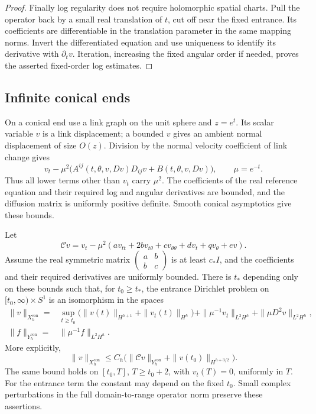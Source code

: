 \begin{proof}
Finally log regularity does not require holomorphic spatial charts.
Pull the operator back by a small real translation of $t$, cut off
near the fixed entrance.  Its coefficients are differentiable in the
translation parameter in the same mapping norms.  Invert the
differentiated equation and use uniqueness to identify its derivative
with $\partial_t v$.  Iteration, increasing the fixed angular order if
needed, proves the asserted fixed-order log estimates.
\end{proof}

\subsection{Infinite conical ends}

On a conical end use a link graph on the unit sphere and $z=e^t$.
Its scalar variable $v$ is a link displacement; a bounded $v$ gives an
ambient normal displacement of size $O(z)$.  Division by the normal
velocity coefficient of link change gives
\[
 v_t-\mu^2\bigl(A^{ij}(t,\theta,v,Dv)D_{ij}v
                         +B(t,\theta,v,Dv)\bigr),\qquad \mu=e^{-t}.
\]
Thus all lower terms other than $v_t$ carry $\mu^2$.  The coefficients
of the real reference equation and their required log and angular
derivatives are bounded, and the diffusion matrix is uniformly
positive definite.  Smooth conical asymptotics give these bounds.

\begin{lemma}\label{lin:conical}
Let
\begin{equation}\label{lin:conical-operator}
 \mathcal Cv=v_t-\mu^2
       (a v_{tt}+2b v_{t\theta}+c v_{\theta\theta}
                               +d v_t+qv_\theta+ev).
\end{equation}
Assume the real symmetric matrix
$\left(\begin{smallmatrix}a&b\\b&c\end{smallmatrix}\right)$ is at least
$c_*I$, and the coefficients and their required derivatives are
uniformly bounded.  There is $t_*$ depending only on these bounds such
that, for $t_0\ge t_*$, the entrance Dirichlet problem on
$[t_0,\infty)\times S^1$ is an isomorphism in the spaces
\begin{align}
 \|v\|_{X^{\mathrm{con}}_h}
 ={}&\sup_{t\ge t_0}
       \bigl(\|v(t)\|_{H^{h+1}}+\|v_t(t)\|_{H^h}\bigr)
       +\|\mu^{-1}v_t\|_{L^2H^h}
       +\|\mu D^2v\|_{L^2H^h},\label{lin:conical-norm}\\
 \|f\|_{Y^{\mathrm{con}}_h}
 ={}&\|\mu^{-1}f\|_{L^2H^h}.\label{lin:conical-source}
\end{align}
More explicitly,
\begin{equation}\label{lin:conical-estimate}
 \|v\|_{X^{\mathrm{con}}_h}
 \le C_h\bigl(\|\mathcal Cv\|_{Y^{\mathrm{con}}_h}
                  +\|v(t_0)\|_{H^{h+3/2}}\bigr).
\end{equation}
The same bound holds on $[t_0,T]$, $T\ge t_0+2$, with $v_t(T)=0$,
uniformly in $T$.
For the entrance term the constant may depend on the fixed $t_0$.
Small complex perturbations in the full domain-to-range operator norm
preserve these assertions.
\end{lemma}

